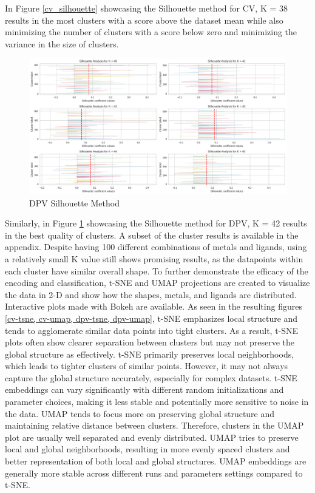 In Figure \ref{cv_silhouette} showcasing the Silhouette method for CV, K = 38 results in the most clusters with a score above the dataset mean while also minimizing the number of clusters with a score below zero and minimizing the variance in the size of clusters. 
\begin{figure}[h!]
  \centering
    \includegraphics[width=1.0\textwidth]{figures/dpv_silhouette.png}
    \caption{DPV Silhouette Method}
    \label{dpv_silhouette}
\end{figure}
Similarly, in Figure \ref{dpv_silhouette} showcasing the Silhouette method for DPV, K = 42 results in the best quality of clusters. A subset of the cluster results is available in the appendix. Despite having 100 different combinations of metals and ligands, using a relatively small K value still shows promising results, as the datapoints within each cluster have similar overall shape. To further demonstrate the efficacy of the encoding and classification, t-SNE and UMAP projections are created to visualize the data in 2-D and show how the shapes, metals, and ligands are distributed. Interactive plots made with Bokeh are available.
As seen in the resulting figures \cref{cv-tsne, cv-umap, dpv-tsne, dpv-umap}, t-SNE emphasizes local structure and tends to agglomerate similar data points into tight clusters. As a result, t-SNE plots often show clearer separation between clusters but may not preserve the global structure as effectively. t-SNE primarily preserves local neighborhoods, which leads to tighter clusters of similar points. However, it may not always capture the global structure accurately, especially for complex datasets. t-SNE embeddings can vary significantly with different random initializations and parameter choices, making it less stable and potentially more sensitive to noise in the data. 
UMAP tends to focus more on preserving global structure and maintaining relative distance between clusters. Therefore, clusters in the UMAP plot are usually well separated and evenly distributed. UMAP tries to preserve local and global neighborhoods, resulting in more evenly spaced clusters and better representation of both local and global structures. UMAP embeddings are generally more stable across different runs and parameters settings compared to t-SNE.
